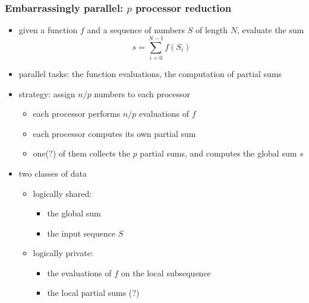 \begin{frame}[fragile]
%
  \frametitle{Embarrassingly parallel: $p$ processor reduction}
%
  \begin{itemize}
%
  \item given a function $f$ and a sequence of numbers $S$ of length $N$, evaluate the sum
    \[
    s = \sum_{i=0}^{N-1}f(S_{i})
    \]
%
  \item parallel tasks: the function evaluations, the computation of partial sums
%
  \item strategy: assign $n/p$ numbers to each processor
    \begin{itemize}
      \item each processor performs $n/p$ evaluations of $f$
      \item each processor computes its own partial sum
      \item one(?) of them collects the $p$ partial sums, and computes the global sum $s$
    \end{itemize}
%
  \item two classes of data
    \begin{itemize}
      \item logically shared:
        \begin{itemize}
        \item the global sum
        \item the input sequence $S$
        \end{itemize}
      \item logically private:
        \begin{itemize}
          \item the evaluations of $f$ on the local subsequence
          \item the local partial sums (?)
        \end{itemize}
    \end{itemize}
%
  \end{itemize}
%
\end{frame}

